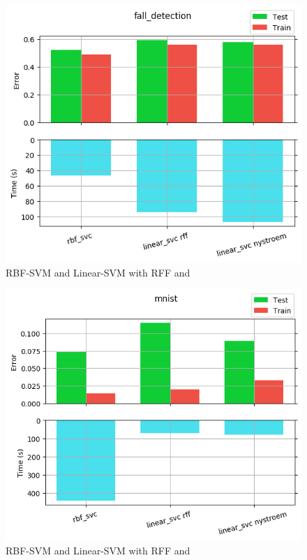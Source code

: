 \begin{figure}[th]
\centering
\includegraphics[scale=\imgscale]{Figures/1_1/fall_detection}
\decoRule
\caption[1.1 fall\tu detection]{RBF-SVM and Linear-SVM with RFF and \Nys}
\label{fig:1_1_fall_detection}
\end{figure}

\begin{figure}[th]
\centering
\includegraphics[scale=\imgscale]{Figures/1_1/mnist}
\decoRule
\caption[1.1 mnist]{RBF-SVM and Linear-SVM with RFF and \Nys}
\label{fig:1_1_mnist}
\end{figure}

